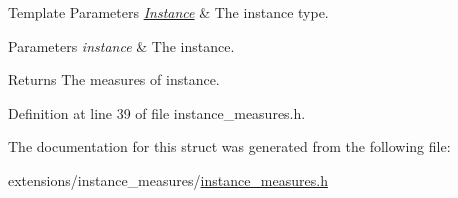 \begin{DoxyTemplParams}{Template Parameters}
{\em \hyperlink{structInstance}{Instance}} & The instance type. \\
\hline
\end{DoxyTemplParams}

\begin{DoxyParams}{Parameters}
{\em instance} & The instance. \\
\hline
\end{DoxyParams}
\begin{DoxyReturn}{Returns}
The measures of {\ttfamily instance}. 
\end{DoxyReturn}


Definition at line 39 of file instance\+\_\+measures.\+h.



The documentation for this struct was generated from the following file\+:\begin{DoxyCompactItemize}
\item 
extensions/instance\+\_\+measures/\hyperlink{instance__measures_8h}{instance\+\_\+measures.\+h}\end{DoxyCompactItemize}
